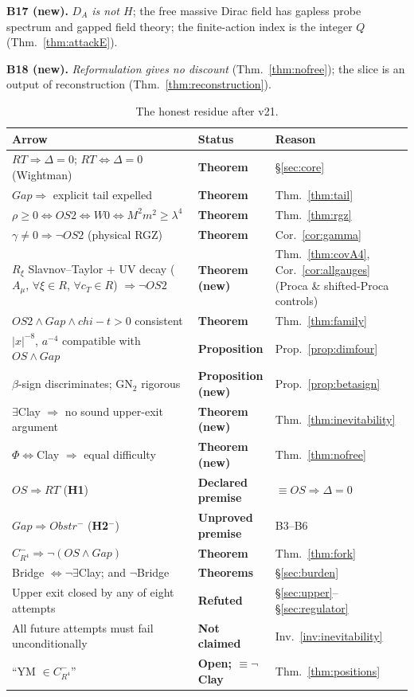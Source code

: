 \documentclass[11pt,a4paper]{article}
\def\R{R}\def\N{N}\def\Q{Q}\def\Z{Z}\def\Class{C}\def\OS{OS}\def\Gap{Gap}%
\def\RT{RT}\def\Obstr{Obstr}\def\Spec{Spec}\def\Htot{H}\def\Chit{chi-t}\def\Lean#1{#1}}
\theoremstyle{plain}
\theoremstyle{definition}
\theoremstyle{remark}
\newcommand{\R}{\mathbb{R}}\newcommand{\N}{\mathbb{N}}\newcommand{\Q}{\mathbb{Q}}
\newcommand{\Z}{\mathbb{Z}}\newcommand{\Spec}{\operatorname{Spec}}
\newcommand{\OS}{\mathrm{OS}}\newcommand{\Gap}{\mathrm{Gap}}
\newcommand{\Obstr}{\mathrm{Obstr}}\newcommand{\RT}{\mathrm{RT}}
\newcommand{\Class}{\mathcal{C}}\newcommand{\Htot}{\mathcal{H}}
\newcommand{\Chit}{\chi_t}
\renewcommand{\_}{\oldunderscore\allowbreak}
\newcommand{\Lean}[1]{\texttt{\small #1}}
\begin{document}
\textbf{B17 (new).} \emph{$D_A$ is not $H$}; the free massive Dirac field has gapless probe
spectrum and gapped field theory; the finite-action index is the integer $Q$
(Thm.~\ref{thm:attackE}).

\textbf{B18 (new).} \emph{Reformulation gives no discount} (Thm.~\ref{thm:nofree}); the slice is
an output of reconstruction (Thm.~\ref{thm:reconstruction}).
\begin{table}[htbp]\centering\small
\renewcommand{\arraystretch}{1.2}
\begin{tabularx}{\textwidth}{p{4.6cm} p{3.0cm} X}
\toprule
\textbf{Arrow} & \textbf{Status} & \textbf{Reason}\\
\midrule
$\RT\Rightarrow\Delta=0$; $\RT\iff\Delta=0$ (Wightman) & \textbf{Theorem} & \S\ref{sec:core}\\
$\Gap\Rightarrow$ explicit tail expelled & \textbf{Theorem} & Thm.~\ref{thm:tail}\\
$\rho\ge0\iff\OS2\iff W0\iff M^2m^2\ge\lambda^4$ & \textbf{Theorem} & Thm.~\ref{thm:rgz}\\
$\gamma\neq0\Rightarrow\neg\OS2$ (physical RGZ) & \textbf{Theorem} & Cor.~\ref{cor:gamma}\\
$R_\xi$ Slavnov--Taylor + UV decay ($A_\mu$, $\forall\xi\in\R$, $\forall c_T\in\R$) $\Rightarrow\neg\OS2$ & \textbf{Theorem (new)} & Thm.~\ref{thm:covA4}, Cor.~\ref{cor:allgauges} (Proca \& shifted-Proca controls)\\
$\OS2\wedge\Gap\wedge\Chit>0$ consistent & \textbf{Theorem} & Thm.~\ref{thm:family}\\
$|x|^{-8}$, $a^{-4}$ compatible with $\OS\wedge\Gap$ & \textbf{Proposition} & Prop.~\ref{prop:dimfour}\\
$\beta$-sign discriminates; GN$_2$ rigorous & \textbf{Proposition (new)} & Prop.~\ref{prop:betasign}\\
$\exists$Clay $\Rightarrow$ no sound upper-exit argument & \textbf{Theorem (new)} &
Thm.~\ref{thm:inevitability}\\
$\Phi\iff$Clay $\Rightarrow$ equal difficulty & \textbf{Theorem (new)} & Thm.~\ref{thm:nofree}\\
$\OS\Rightarrow\RT$ (\textbf{H1}) & \textbf{Declared premise} & $\equiv\OS\Rightarrow\Delta=0$\\
$\Gap\Rightarrow\Obstr^-$ (\textbf{H2$^-$}) & \textbf{Unproved premise} & B3--B6\\
$\Class^-_{\R^4}\Rightarrow\neg(\OS\wedge\Gap)$ & \textbf{Theorem} & Thm.~\ref{thm:fork}\\
Bridge $\iff\neg\exists$Clay; and $\neg$Bridge & \textbf{Theorems} & \S\ref{sec:burden}\\
Upper exit closed by any of eight attempts & \textbf{Refuted} &
\S\ref{sec:upper}--\S\ref{sec:regulator}\\
All future attempts must fail unconditionally & \textbf{Not claimed} & Inv.~\ref{inv:inevitability}\\
``YM $\in\Class^-_{\R^4}$'' & \textbf{Open; $\equiv\neg$Clay} & Thm.~\ref{thm:positions}\\
\bottomrule
\end{tabularx}
\caption{The honest residue after v21.}
\label{tab:verdict}
\end{table}
\end{document}
